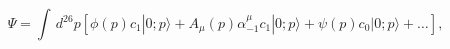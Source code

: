 \begin{equation}
\Psi = \int \, d^{26}p \left[
\phi(p) c_1 |0;p\rangle + A_{\mu}(p) \alpha_{-1}^{\mu} c_1 |0;p\rangle
 + \psi(p) c_0 |0;p\rangle + \ldots\right],
\end{equation}


